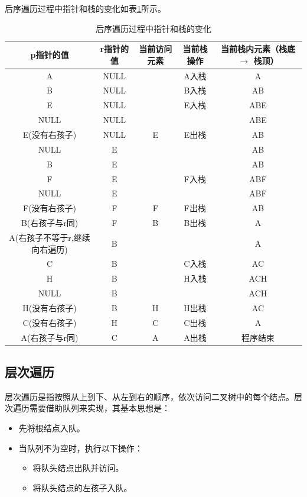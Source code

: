 \documentclass[lang=cn,newtx,10pt,scheme=chinese]{elegantbook}
\begin{document}
后序遍历过程中指针和栈的变化如表\ref{tab:postorder_stack}所示。
\begin{table}[h!]
  \centering
  \caption{后序遍历过程中指针和栈的变化}
  \begin{tabular}{|c|c|c|c|c|}
  \hline
  \textbf{p指针的值} & \textbf{r指针的值} & \textbf{当前访问元素} & \textbf{当前栈操作} & \textbf{当前栈内元素（栈底 $\to$ 栈顶）} \\ \hline
  A & NULL &  & A入栈 & A \\ \hline
  B & NULL &  & B入栈 & AB \\ \hline
  E & NULL &  & E入栈 & ABE \\ \hline
  NULL & NULL &  &  & ABE \\ \hline
  E(没有右孩子) & NULL & E & E出栈 & AB \\ \hline
  NULL & E &  &  & AB \\ \hline
  B & E &  &  & AB \\ \hline
  F & E &  & F入栈 & ABF \\ \hline
  NULL & E &  &  & ABF \\ \hline
  F(没有右孩子) & F & F & F出栈 & AB \\ \hline
  B(右孩子与r同) & F & B & B出栈 & A \\ \hline
  A(右孩子不等于r,继续向右遍历) & B &  &  & A \\ \hline
  C & B &  & C入栈 & AC \\ \hline
  H & B &  & H入栈 & ACH \\ \hline
  NULL & B &  &  & ACH \\ \hline
  H(没有右孩子) & B & H & H出栈 & AC \\ \hline
  C(没有右孩子) & H & C & C出栈 & A \\ \hline
  A(右孩子与r同) & C & A & A出栈 & 程序结束 \\ \hline
  \end{tabular}
  \label{tab:postorder_stack}
  \end{table}
\subsection{层次遍历}

层次遍历是指按照从上到下、从左到右的顺序，依次访问二叉树中的每个结点。层次遍历需要借助队列来实现，其基本思想是：

\begin{itemize}
  \item 先将根结点入队。
  \item 当队列不为空时，执行以下操作：
  \begin{itemize}
    \item 将队头结点出队并访问。
    \item 将队头结点的左孩子入队。
  \end{itemize}
\end{itemize}
\end{document}
